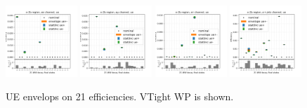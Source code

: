 \begin{figure}
    \includegraphics[width=0.24\textwidth]{chapters/Appendix/sectionTTSyst/figures/afterCorr/icata3_ch0_ue.png}
    \includegraphics[width=0.24\textwidth]{chapters/Appendix/sectionTTSyst/figures/afterCorr/icata3_ch1_ue.png}
    \includegraphics[width=0.24\textwidth]{chapters/Appendix/sectionTTSyst/figures/afterCorr/icata3_ch2_ue.png}
    \includegraphics[width=0.24\textwidth]{chapters/Appendix/sectionTTSyst/figures/afterCorr/icata3_ch3_ue.png}
    
    \caption{UE envelops on 21 efficiencies. VTight WP is shown.}
    \label{fig:appendix:reweighttt:effAfterCorrUE}
\end{figure}


\FloatBarrier
